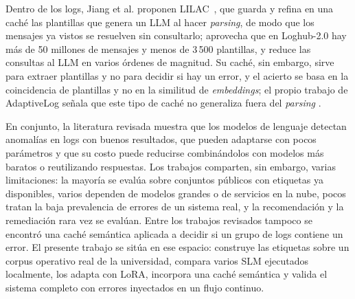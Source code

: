 Dentro de los logs, Jiang et al. proponen LILAC~\cite{jiang2024_lilac}, que guarda y refina en una caché las plantillas que genera un LLM al hacer \textit{parsing}, de modo que los mensajes ya vistos se resuelven sin consultarlo; aprovecha que en Loghub-2.0 hay más de 50 millones de mensajes y menos de 3\,500 plantillas, y reduce las consultas al LLM en varios órdenes de magnitud. Su caché, sin embargo, sirve para extraer plantillas y no para decidir si hay un error, y el acierto se basa en la coincidencia de plantillas y no en la similitud de \textit{embeddings}; el propio trabajo de AdaptiveLog señala que este tipo de caché no generaliza fuera del \textit{parsing} \cite{ma2026_adaptivelog}.

En conjunto, la literatura revisada muestra que los modelos de lenguaje detectan anomalías en logs con buenos resultados, que pueden adaptarse con pocos parámetros y que su costo puede reducirse combinándolos con modelos más baratos o reutilizando respuestas. Los trabajos comparten, sin embargo, varias limitaciones: la mayoría se evalúa sobre conjuntos públicos con etiquetas ya disponibles, varios dependen de modelos grandes o de servicios en la nube, pocos tratan la baja prevalencia de errores de un sistema real, y la recomendación y la remediación rara vez se evalúan. Entre los trabajos revisados tampoco se encontró una caché semántica aplicada a decidir si un grupo de logs contiene un error. El presente trabajo se sitúa en ese espacio: construye las etiquetas sobre un corpus operativo real de la universidad, compara varios SLM ejecutados localmente, los adapta con LoRA, incorpora una caché semántica y valida el sistema completo con errores inyectados en un flujo continuo.
